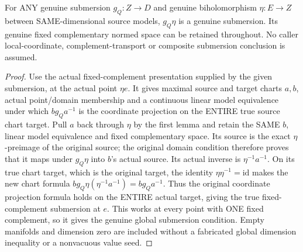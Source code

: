 \begin{theorem}
\label{hir:smooth-terminal-submersion-biholomorphic-precomposition}
\leanok
{}
For ANY genuine submersion $g_Q:Z\to D$ and genuine biholomorphism
$\eta:E\to Z$ between SAME-dimensional source models, $g_Q\eta$ is a
genuine submersion. Its genuine fixed complementary normed space can be
retained throughout. No caller local-coordinate, complement-transport or
composite submersion conclusion is assumed.
\end{theorem}
\begin{proof}
Use the actual fixed-complement presentation supplied by the given
submersion, at the actual point $\eta e$. It gives maximal source and
target charts $a,b$, actual point/domain membership and a continuous
linear model equivalence under which $b g_Q a^{-1}$ is the coordinate
projection on the ENTIRE true source chart target. Pull $a$ back through
$\eta$ by the first lemma and retain the SAME $b$, linear model equivalence
and fixed complementary space. Its source is the exact $\eta$-preimage of
the original source; the original domain condition therefore proves that
it maps under $g_Q\eta$ into $b$'s actual source. Its actual inverse is
$\eta^{-1}a^{-1}$. On its true chart target, which is the original target,
the identity $\eta\eta^{-1}=\mathrm{id}$ makes the new chart formula
$b g_Q\eta(\eta^{-1}a^{-1})=b g_Q a^{-1}$. Thus the original coordinate
projection formula holds on the ENTIRE actual target, giving the true
fixed-complement submersion at $e$. This works at every point with ONE
fixed complement, so it gives the genuine global submersion condition.
Empty manifolds and dimension zero are included without a fabricated
global dimension inequality or a nonvacuous value seed.
\end{proof}

